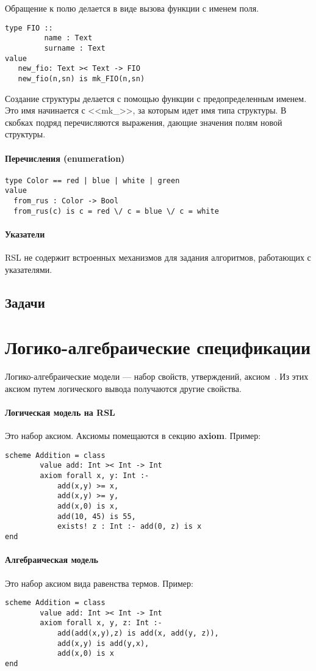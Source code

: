 \documentclass[14pt, twoside]{extreport}
\newcommand{\head}[1]{\vspace{1cm}\subsubsection*{#1}}
\begin{document}
Обращение к полю делается в виде вызова функции с именем поля.

\begin{lstlisting}
type FIO ::
         name : Text
         surname : Text
value
   new_fio: Text >< Text -> FIO
   new_fio(n,sn) is mk_FIO(n,sn)    
\end{lstlisting}

Создание структуры делается с помощью функции с предопределенным именем. Это имя начинается с <<mk\_>>, за которым идет имя типа структуры. В скобках подряд перечисляются выражения, дающие значения полям новой структуры.

\head{Перечисления (enumeration)}
\begin{lstlisting}
type Color == red | blue | white | green
value
  from_rus : Color -> Bool
  from_rus(c) is c = red \/ c = blue \/ c = white
\end{lstlisting}

\head{Указатели}
RSL не содержит встроенных механизмов для задания алгоритмов, работающих с указателями.

\section*{Задачи}




\chapter{Логико-алгебраические спецификации}

Логико-алгебраические модели --- набор свойств, утверждений, аксиом~\cite{kuliamin}. Из этих аксиом путем логического вывода получаются другие свойства.

\head{Логическая модель на RSL}
Это набор аксиом. Аксиомы помещаются в секцию \textbf{axiom}. Пример:
\begin{lstlisting}
scheme Addition = class
        value add: Int >< Int -> Int
        axiom forall x, y: Int :-
            add(x,y) >= x,
            add(x,y) >= y,
            add(x,0) is x,
            add(10, 45) is 55,
            exists! z : Int :- add(0, z) is x
end
\end{lstlisting}

\head{Алгебраическая модель}
Это набор аксиом вида равенства термов. Пример:
\begin{lstlisting}
scheme Addition = class
        value add: Int >< Int -> Int
        axiom forall x, y, z: Int :-
            add(add(x,y),z) is add(x, add(y, z)),
            add(x,y) is add(y,x),
            add(x,0) is x
end
\end{lstlisting}
\end{document}
